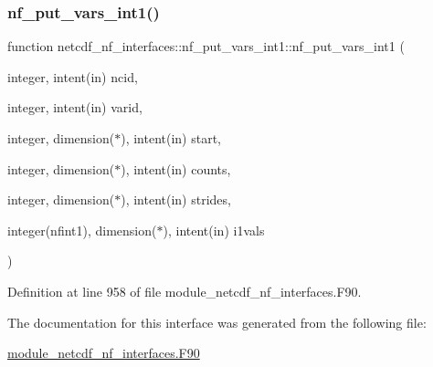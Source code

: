 \subsubsection{\texorpdfstring{nf\+\_\+put\+\_\+vars\+\_\+int1()}{nf\_put\_vars\_int1()}}
{\footnotesize\ttfamily function netcdf\+\_\+nf\+\_\+interfaces\+::nf\+\_\+put\+\_\+vars\+\_\+int1\+::nf\+\_\+put\+\_\+vars\+\_\+int1 (\begin{DoxyParamCaption}\item[{integer, intent(in)}]{ncid,  }\item[{integer, intent(in)}]{varid,  }\item[{integer, dimension($\ast$), intent(in)}]{start,  }\item[{integer, dimension($\ast$), intent(in)}]{counts,  }\item[{integer, dimension($\ast$), intent(in)}]{strides,  }\item[{integer(nfint1), dimension($\ast$), intent(in)}]{i1vals }\end{DoxyParamCaption})}



Definition at line 958 of file module\+\_\+netcdf\+\_\+nf\+\_\+interfaces.\+F90.



The documentation for this interface was generated from the following file\+:\begin{DoxyCompactItemize}
\item 
\hyperlink{module__netcdf__nf__interfaces_8F90}{module\+\_\+netcdf\+\_\+nf\+\_\+interfaces.\+F90}\end{DoxyCompactItemize}
